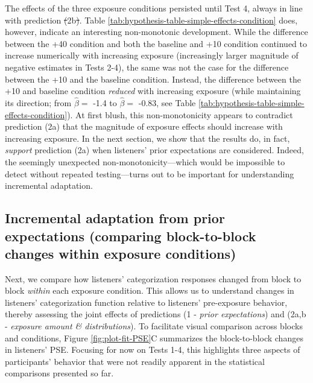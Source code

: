 \documentclass[
  11pt,
  man,mask,floatsintext]{apa6}
\makeatletter
\providecommand{\DIFdel}[1]{{\protect\color{red}\sout{#1}}} %
\providecommand{\DIFdelbegin}{} %
\providecommand{\DIFdelend}{} %
\newcommand{\DIFscaledelfig}{0.5}
\newlength{\DIFdelgraphicswidth} %
\newlength{\DIFdelgraphicsheight} %
\newcommand{\DIFdelincludegraphics}[2][]{%
\sbox{\DIFdelgraphicsbox}{\DIFOincludegraphics[#1]{#2}}%
\settoboxwidth{\DIFdelgraphicswidth}{\DIFdelgraphicsbox} %
\settoboxtotalheight{\DIFdelgraphicsheight}{\DIFdelgraphicsbox} %
\scalebox{\DIFscaledelfig}{%
\parbox[b]{\DIFdelgraphicswidth}{\usebox{\DIFdelgraphicsbox}\\[-\baselineskip] \rule{\DIFdelgraphicswidth}{0em}}\llap{\resizebox{\DIFdelgraphicswidth}{\DIFdelgraphicsheight}{%
\setlength{\unitlength}{\DIFdelgraphicswidth}%
\begin{picture}(1,1)%
\thicklines\linethickness{2pt} %
{\color[rgb]{1,0,0}\put(0,0){\framebox(1,1){}}}%
{\color[rgb]{1,0,0}\put(0,0){\line( 1,1){1}}}%
{\color[rgb]{1,0,0}\put(0,1){\line(1,-1){1}}}%
\end{picture}%
}\hspace*{3pt}}} %
} %
\DeclareRobustCommand{\DIFdelbegin}{\DIFOdelbegin \let\includegraphics\DIFdelincludegraphics} %
\DeclareRobustCommand{\DIFdelend}{\DIFOaddend \let\includegraphics\DIFOincludegraphics} %
\let\sout@orig\sout %
\renewcommand{\sout}[1]{\ifmmode\text{\sout@orig{\ensuremath{#1}}}\else\sout@orig{#1}\fi} %
\makeatother
\begin{document}
The effects of the three exposure conditions persisted until Test 4, always in line with prediction \DIFdelbegin \DIFdel{(}\DIFdelend 2b\DIFdelbegin \DIFdel{)}\DIFdelend . Table \ref{tab:hypothesis-table-simple-effects-condition} does, however, indicate an interesting non-monotonic development. While the difference between the +40 condition and both the baseline and +10 condition continued to increase numerically with increasing exposure (increasingly larger magnitude of negative estimates in Tests 2-4), the same was not the case for the difference between the +10 and the baseline condition. Instead, the difference between the +10 and baseline condition \emph{reduced} with increasing exposure (while maintaining its direction; from \(\hat{\beta} =\) -1.4 to \(\hat{\beta} =\) -0.83, see Table \ref{tab:hypothesis-table-simple-effects-condition}). At first blush, this non-monotonicity appears to contradict prediction (2a) that the magnitude of exposure effects should increase with increasing exposure. In the next section, we show that the results do, in fact, \emph{support} prediction (2a) when listeners' prior expectations are considered. Indeed, the seemingly unexpected non-monotonicity---which would be impossible to detect without repeated testing---turns out to be important for understanding incremental adaptation.

\subsection{Incremental adaptation from prior expectations (comparing block-to-block changes within exposure conditions)}\label{incremental-adaptation-from-prior-expectations-comparing-block-to-block-changes-within-exposure-conditions}

Next, we compare how listeners' categorization responses changed from block to block \emph{within} each exposure condition. This allows us to understand changes in listeners' categorization function relative to listeners' pre-exposure behavior, thereby assessing the joint effects of predictions (1 - \emph{prior expectations}) and (2a,b - \emph{exposure amount \& distributions}). To facilitate visual comparison across blocks and conditions, Figure \ref{fig:plot-fit-PSE}C summarizes the block-to-block changes in listeners' PSE. Focusing for now on Tests 1-4, this highlights three aspects of participants' behavior that were not readily apparent in the statistical comparisons presented so far.
\end{document}
